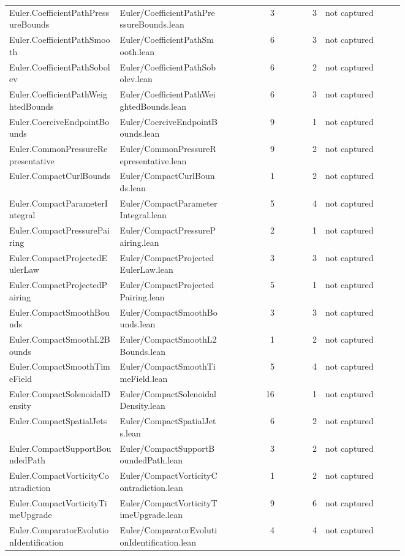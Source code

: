 \documentclass[10pt]{article}
\begin{document}
\begin{longtable}{p{0.28\linewidth}p{0.27\linewidth}r r p{0.20\linewidth}}
Euler.CoefficientPathPressureBounds & Euler/CoefficientPathPressureBounds.lean & 3 & 3 & not captured\\
Euler.CoefficientPathSmooth & Euler/CoefficientPathSmooth.lean & 6 & 3 & not captured\\
Euler.CoefficientPathSobolev & Euler/CoefficientPathSobolev.lean & 6 & 2 & not captured\\
Euler.CoefficientPathWeightedBounds & Euler/CoefficientPathWeightedBounds.lean & 6 & 3 & not captured\\
Euler.CoerciveEndpointBounds & Euler/CoerciveEndpointBounds.lean & 9 & 1 & not captured\\
Euler.CommonPressureRepresentative & Euler/CommonPressureRepresentative.lean & 9 & 2 & not captured\\
Euler.CompactCurlBounds & Euler/CompactCurlBounds.lean & 1 & 2 & not captured\\
Euler.CompactParameterIntegral & Euler/CompactParameterIntegral.lean & 5 & 4 & not captured\\
Euler.CompactPressurePairing & Euler/CompactPressurePairing.lean & 2 & 1 & not captured\\
Euler.CompactProjectedEulerLaw & Euler/CompactProjectedEulerLaw.lean & 3 & 3 & not captured\\
Euler.CompactProjectedPairing & Euler/CompactProjectedPairing.lean & 5 & 1 & not captured\\
Euler.CompactSmoothBounds & Euler/CompactSmoothBounds.lean & 3 & 3 & not captured\\
Euler.CompactSmoothL2Bounds & Euler/CompactSmoothL2Bounds.lean & 1 & 2 & not captured\\
Euler.CompactSmoothTimeField & Euler/CompactSmoothTimeField.lean & 5 & 4 & not captured\\
Euler.CompactSolenoidalDensity & Euler/CompactSolenoidalDensity.lean & 16 & 1 & not captured\\
Euler.CompactSpatialJets & Euler/CompactSpatialJets.lean & 6 & 2 & not captured\\
Euler.CompactSupportBoundedPath & Euler/CompactSupportBoundedPath.lean & 3 & 2 & not captured\\
Euler.CompactVorticityContradiction & Euler/CompactVorticityContradiction.lean & 1 & 2 & not captured\\
Euler.CompactVorticityTimeUpgrade & Euler/CompactVorticityTimeUpgrade.lean & 9 & 6 & not captured\\
Euler.ComparatorEvolutionIdentification & Euler/ComparatorEvolutionIdentification.lean & 4 & 4 & not captured\\

\end{longtable}
\end{document}
